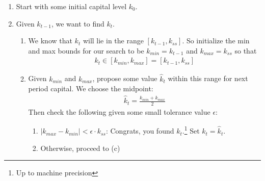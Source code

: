 \documentclass[12pt]{article}
\theoremstyle{plain}
\theoremstyle{definition}
\theoremstyle{remark}
\begin{document}
\begin{enumerate}
  \item Start with some initial capital level $k_0$.

  \item Given $k_{t-1}$, we want to find $k_{t}$.
    \begin{enumerate}
      \item We know that $k_{t}$ will lie in the range
        $[k_{t-1},k_{ss}]$. So initialize the min and max bounds for our
        search to be $k_{min}=k_{t-1}$ and $k_{max}=k_{ss}$ so that
        \begin{align*}
          k_{t} \in [k_{min},k_{max}]
          = [k_{t-1},k_{ss}]
        \end{align*}

      \item Given $k_{min}$ and $k_{max}$, propose some value
        $\hat{k}_{t}$ within this range for next period capital. We
        choose the midpoint:
        \begin{align*}
          \hat{k}_{t} = \frac{k_{min}+k_{max}}{2}
        \end{align*}
        Then check the following given some small tolerance value
        $\epsilon$:
        \begin{enumerate}
          \item $|k_{max}-k_{min}|< \epsilon \cdot k_{ss}$: Congrats,
            you found $k_{t}$.\footnote{Up to machine precision}
            Set $k_t=\hat{k}_t$.
          \item Otherwise, proceed to (c)
        \end{enumerate}


\end{enumerate}
\end{enumerate}
\end{document}

